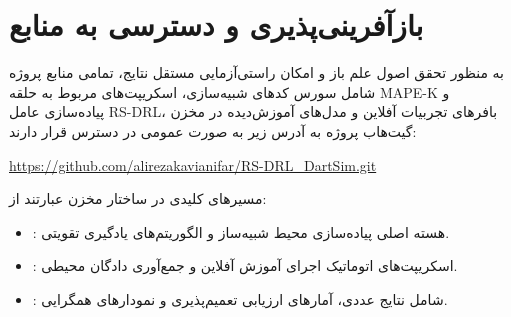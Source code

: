 \documentclass[oneside,openany,a4paper,12pt,draft]{article}
\begin{document}
\section{بازآفرینی‌پذیری و دسترسی به منابع}
به منظور تحقق اصول علم باز و امکان راستی‌آزمایی مستقل نتایج، تمامی منابع پروژه شامل سورس کدهای شبیه‌سازی، اسکریپت‌های مربوط به حلقه MAPE-K و پیاده‌سازی عامل RS-DRL، بافرهای تجربیات آفلاین و مدل‌های آموزش‌دیده در مخزن گیت‌هاب پروژه به آدرس زیر به صورت عمومی در دسترس قرار دارند:
\begin{center}
\url{https://github.com/alirezakavianifar/RS-DRL_DartSim.git}
\end{center}
مسیرهای کلیدی در ساختار مخزن عبارتند از:
\begin{itemize}
    \item {}: هسته اصلی پیاده‌سازی محیط شبیه‌ساز و الگوریتم‌های یادگیری تقویتی.
    \item {}: اسکریپت‌های اتوماتیک اجرای آموزش آفلاین و جمع‌آوری دادگان محیطی.
    \item {}: شامل نتایج عددی، آمارهای ارزیابی تعمیم‌پذیری و نمودارهای همگرایی.
\end{itemize}
\end{document}
